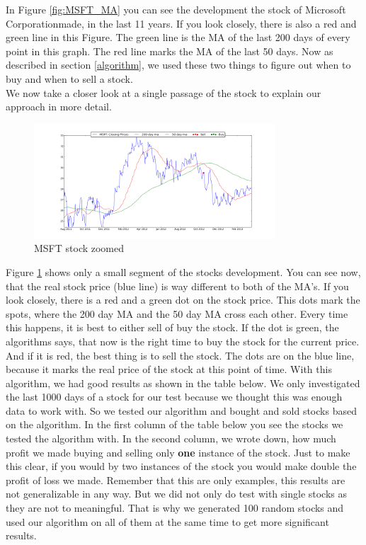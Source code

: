 \documentclass[conference]{IEEEtran}
\begin{document}
 In Figure \ref{fig:MSFT_MA} you can see the development the stock of Microsoft Corporation\texttrademark made, in the last 11 years. If you look closely, there is also a red and green line in this Figure. The green line is the MA of the last 200 days of every point in this graph. The  red line marks the MA of the last 50 days. Now as described in section \ref{algorithm}, we used these two things to figure out when to buy and when to sell a stock.
\\
We now take a closer look at a single passage of the stock to explain our approach in more detail.
\\
\begin{figure}[!h]
  \includegraphics{MSFT_Zoomed}
  \caption{MSFT stock zoomed}
  \label{fig:MSFT_Z}
\end{figure}

Figure \ref{fig:MSFT_Z} shows only a small segment of the stocks development. You can see now, that the real stock price (blue line) is way different to both of the MA's. If you look closely, there is a red and a green dot on the stock price. This dots mark the spots, where the 200 day MA and the 50 day MA cross each other. Every time this happens, it is best to either sell of buy the stock. If the dot is green, the algorithms says, that now is the right time to buy the stock for the current price. And if it is red, the best thing is to sell the stock. The dots are on the blue line, because it marks the real price of the stock at this point of time. With this algorithm, we had good results as shown in the table below. We only investigated the last 1000 days of a stock for our test because we thought this was enough data to work with. So we tested our algorithm and bought and sold stocks based on the algorithm. In the first column of the table below you see the stocks we tested the algorithm with. In the second column, we wrote down, how much profit we made buying and selling only \textbf{one} instance of the stock. Just to make this clear, if you would by two instances of the stock you would make double the profit of loss we made. Remember that this are only examples, this results are not generalizable in any way. But we did not only do test with single stocks as they are not to meaningful. That is why we generated 100 random stocks and used our algorithm on all of them at the same time to get more significant results.
\end{document}
